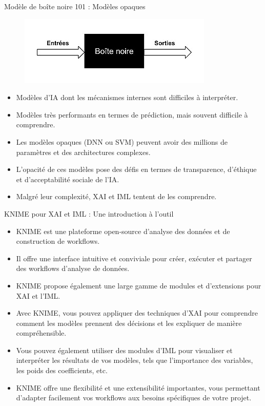 \documentclass{beamer}
\begin{document}
\begin{frame}{Modèle de boîte noire 101 : Modèles opaques}
\begin{center}
	\begin{figure}
			\includegraphics[width=0.6\linewidth]{350px-Schéma_d'une_boîte_noire.jpg}
	\end{figure}
\end{center}
	\begin{itemize}
		\item Modèles d'IA dont les mécanismes internes sont difficiles à interpréter.
		\item Modèles très performants en termes de prédiction, mais souvent difficile à comprendre.
		\item Les modèles opaques (DNN ou SVM) peuvent avoir des millions de paramètres et des architectures complexes.
		\item L'opacité de ces modèles pose des défis en termes de transparence, d'éthique et d'acceptabilité sociale de l'IA.
		\item Malgré leur complexité, XAI et IML tentent de les comprendre.
	\end{itemize}

\end{frame}



\begin{frame}{KNIME pour XAI et IML : Une introduction à l'outil}
	\begin{itemize}
		\item KNIME est une plateforme open-source d'analyse des données et de construction de workflows.
		\item Il offre une interface intuitive et conviviale pour créer, exécuter et partager des workflows d'analyse de données.
		\item KNIME propose également une large gamme de modules et d'extensions pour XAI et l'IML.
		\item Avec KNIME, vous pouvez appliquer des techniques d'XAI pour comprendre comment les modèles prennent des décisions et les expliquer de manière compréhensible.
		\item Vous pouvez également utiliser des modules d'IML pour visualiser et interpréter les résultats de vos modèles, tels que l'importance des variables, les poids des coefficients, etc.
		\item KNIME offre une flexibilité et une extensibilité importantes, vous permettant d'adapter facilement vos workflows aux besoins spécifiques de votre projet.
	\end{itemize}
\end{frame}
\end{document}
